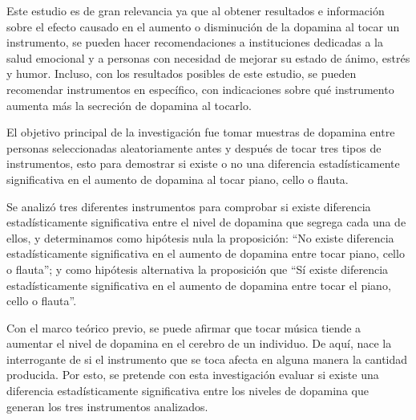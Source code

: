 \vspace{0.5cm}
Este estudio es de gran relevancia ya que al obtener resultados e información sobre el efecto causado en el aumento o disminución de la dopamina al tocar un instrumento, se pueden hacer recomendaciones a instituciones dedicadas a la salud emocional y a personas con necesidad de mejorar su estado de ánimo, estrés y humor. Incluso, con los resultados posibles de este estudio, se pueden recomendar instrumentos en específico, con indicaciones sobre qué instrumento aumenta más la secreción de dopamina al tocarlo.



\vspace{0.5cm}
El objetivo principal de la investigación fue tomar muestras de dopamina entre personas seleccionadas aleatoriamente antes y después de tocar tres tipos de instrumentos, esto para demostrar si existe o no una diferencia estadísticamente significativa en el aumento de dopamina  al  tocar piano, cello o flauta.


\vspace{0.5cm}
Se analizó tres diferentes instrumentos para comprobar si existe diferencia estadísticamente significativa entre el nivel de dopamina que segrega cada una de ellos, y determinamos como hipótesis nula la proposición: ``No existe diferencia estadísticamente significativa  en el aumento de dopamina entre tocar piano, cello o flauta''; y como hipótesis alternativa la proposición que ``Sí existe diferencia estadísticamente significativa  en el aumento de dopamina entre tocar el piano, cello o flauta''. 

\vspace{0.5cm}
Con el marco teórico previo, se puede afirmar que tocar música tiende a aumentar el nivel de dopamina en el cerebro de un individuo. De aquí, nace la interrogante de si el instrumento que se toca afecta en alguna manera la cantidad producida. Por esto, se pretende con esta investigación evaluar si existe una diferencia estadísticamente significativa entre los niveles de dopamina que generan los tres instrumentos analizados.


